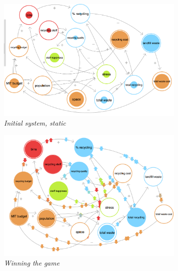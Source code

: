 \documentclass[nofonts,nols,justified,nobib]{tufte-book}
\begin{document}
\begin{figure}
  \centering
  \caption{Developing a more complex approach}
  \label{optimising}
\begin{subfigure}{.3\textwidth}
  \centering
  \includegraphics[width=1\linewidth]{img/3/loopy/big-static.png}
\caption{\textit{Initial system, static}}
\end{subfigure}
 \quad
\begin{subfigure}{.3\textwidth}
  \centering
  \includegraphics[width=1\linewidth]{img/3/loopy/big-win.png}
\caption{\textit{Winning the game}}
  \label{small:win}
\end{subfigure}%
\quad
\begin{subfigure}{.3\textwidth}
  \centering

\end{subfigure}
\end{figure}
\end{document}
